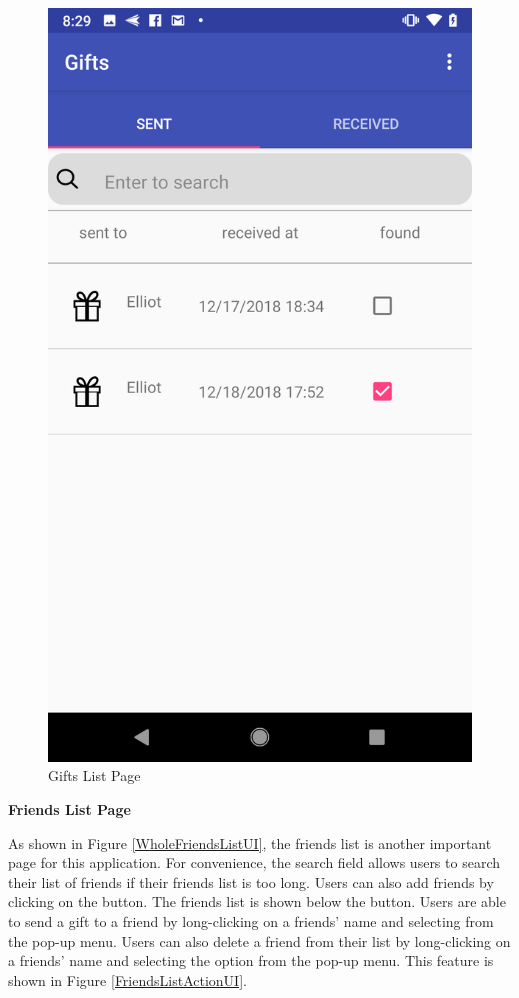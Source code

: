\begin{figure}[htb]
\centering
\includegraphics[width=.45\textwidth]{section03/assets/GiftsList.png}
\caption[Gifts List Page]{\label{GiftsListUI}Gifts List Page}
\end{figure}

\textbf{Friends List Page}

\par As shown in Figure \ref{WholeFriendsListUI}, the friends list is another important page for this application. For convenience, the search field allows users to search their list of friends if their friends list is too long. Users can also add friends by clicking on the  button. The friends list is shown below the  button. Users are able to send a gift to a friend by long-clicking on a friends' name and selecting  from the pop-up menu.  Users can also delete a friend from their list by long-clicking on a friends' name and selecting the  option from the pop-up menu.  This feature is shown in Figure \ref{FriendsListActionUI}. 

